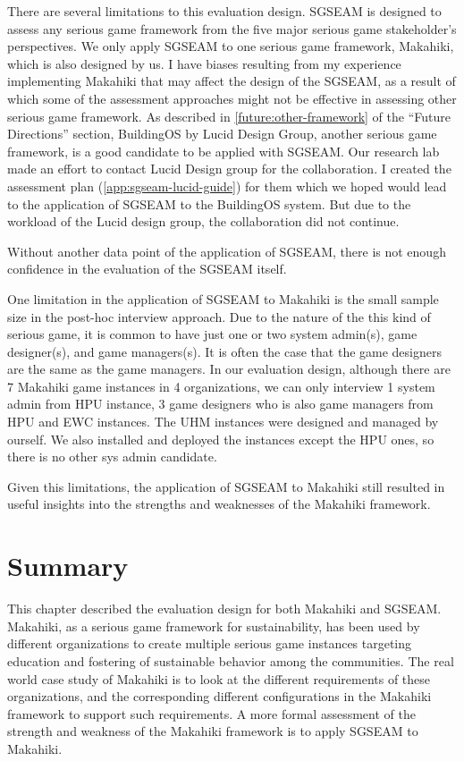 There are several limitations to this evaluation design. SGSEAM is designed to assess any serious game framework from the five major serious game stakeholder's perspectives. We only apply SGSEAM to one serious game framework, Makahiki, which is also designed by us. I have biases resulting from my experience implementing Makahiki that may affect the design of the SGSEAM, as a result of which some of the assessment approaches might not be effective in assessing other serious game framework. As described in \autoref{future:other-framework} of the ``Future Directions'' section, BuildingOS\cite{building-dashboard} by Lucid Design Group, another serious game framework, is a good candidate to be applied with SGSEAM. Our research lab made an effort to contact Lucid Design group for the collaboration. I created the assessment plan (\autoref{app:sgseam-lucid-guide}) for them which we hoped would lead to the application of SGSEAM to the BuildingOS system. But due to the workload of the Lucid design group, the collaboration did not continue.

Without another data point of the application of SGSEAM, there is not enough confidence in the evaluation of the SGSEAM itself. 

One limitation in the application of SGSEAM to Makahiki is the small sample size in the post-hoc interview approach. Due to the nature of the this kind of serious game, it is common to have just one or two system admin(s), game designer(s), and game managers(s). It is often the case that the game designers are the same as the game managers. In our evaluation design, although there are 7 Makahiki game instances in 4 organizations, we can only interview 1 system admin from HPU instance, 3 game designers who is also game managers from HPU and EWC instances. The UHM instances were designed and managed by ourself. We also installed and deployed the instances except the HPU ones, so there is no other sys admin candidate.  

Given this limitations, the application of SGSEAM to Makahiki still resulted in useful insights into the strengths and weaknesses of the Makahiki framework.

\section{Summary}

This chapter described the evaluation design for both Makahiki and SGSEAM.  Makahiki, as a serious game framework for sustainability, has been used by different organizations to create multiple serious game instances targeting education and fostering of sustainable behavior among the communities. The real world case study of Makahiki is to look at the different requirements of these organizations, and the corresponding different configurations in the Makahiki framework to support such requirements. A more formal assessment of the strength and weakness of the Makahiki framework is to apply SGSEAM to Makahiki.

